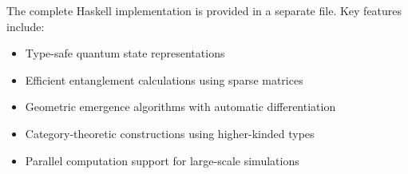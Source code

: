 \documentclass[12pt,a4paper]{article}
\theoremstyle{plain}
\theoremstyle{definition}
\theoremstyle{remark}
\begin{document}
The complete Haskell implementation is provided in a separate file. Key features include:

\begin{itemize}
\item Type-safe quantum state representations
\item Efficient entanglement calculations using sparse matrices
\item Geometric emergence algorithms with automatic differentiation
\item Category-theoretic constructions using higher-kinded types
\item Parallel computation support for large-scale simulations
\end{itemize}
\end{document}
